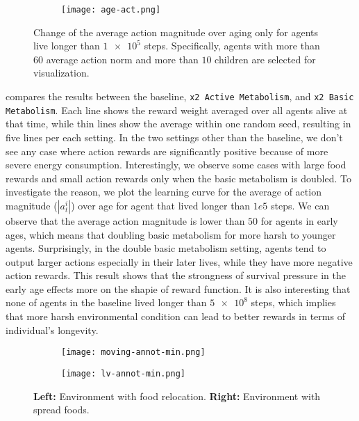 \begin{figure}[t]
  \begin{subfigure}[t]{7cm}
    \centering
    \texttt{[image: age-act.png]}
  \end{subfigure}
  \caption{
    Change of the average action magnitude over aging only for agents live longer than $\num{1e5}$ steps.
    Specifically, agents with more than $60$ average action norm and more than $10$ children are selected for visualization.
  }\label{figure:actnorm-age}
\end{figure}

 compares the results between the baseline, \texttt{x2 Active Metabolism}, and \texttt{x2 Basic Metabolism}. Each line shows the reward weight averaged over all agents alive at that time, while thin lines show the average within one random seed, resulting in five lines per each setting. In the two settings other than the baseline, we don't see any case where action rewards are significantly positive because of more severe energy consumption. Interestingly, we observe some cases with large food rewards and small action rewards only when the basic metabolism is doubled. To investigate the reason, we plot the learning curve for the average of action magnitude ($|a_{t}^{i}|$) over age for agent that lived longer than $1e5$ steps. We can observe that the average action magnitude is lower than $50$ for agents in early ages, which means that doubling basic metabolism for more harsh to younger agents. Surprisingly, in the double basic metabolism setting, agents tend to output larger actions especially in their later lives, while they have more negative action rewards. This result shows that the strongness of survival pressure in the early age effects more on the shapie of reward function. It is also interesting that none of agents in the baseline lived longer than $\num{5e8}$ steps, which implies that more harsh environmental condition can lead to better rewards in terms of individual's longevity.

\begin{figure}[t]
  \begin{subfigure}[t]{4cm}
    \centering
    \texttt{[image: moving-annot-min.png]}
  \end{subfigure}
  \begin{subfigure}[t]{4cm}
    \centering
    \texttt{[image: lv-annot-min.png]}
  \end{subfigure}
  \caption{
    \textbf{Left:} Environment with food relocation.
    \textbf{Right:} Environment with spread foods.
  }\label{figure:foodloc}
\end{figure}


